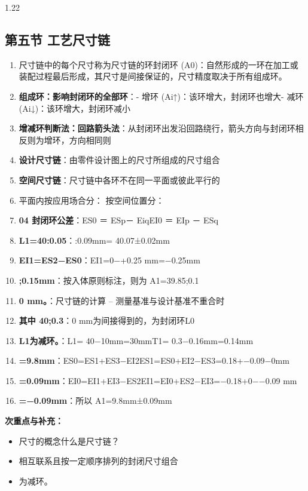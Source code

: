 \documentclass[12pt,a4paper]{article}
\begin{document}
\begin{spacing}{1.22}
\subsection{第五节 工艺尺寸链}
\begin{tcolorbox}[colback=yellow!6,colframe=red!55!black,title=重点,left=1mm,right=1mm]
\begin{enumerate}[leftmargin=2.2em,label=\arabic*.]
  \item 尺寸链中的每个尺寸称为尺寸链的环封闭环 (A0)：自然形成的一环在加工或装配过程最后形成，其尺寸是间接保证的，尺寸精度取决于所有组成环。
  \item \textbf{组成环：影响封闭环的全部环}：- 增环 (Ai↑)：该环增大，封闭环也增大- 减环 (Ai↓)：该环增大，封闭环减小
  \item \textbf{增减环判断法：回路箭头法}：从封闭环出发沿回路绕行，箭头方向与封闭环相反则为增环，方向相同则
  \item \textbf{设计尺寸链}：由零件设计图上的尺寸所组成的尺寸组合
  \item \textbf{空间尺寸链}：尺寸链中各环不在同一平面或彼此平行的
  \item 平面内按应用场合分： 按空间位置分：
  \item \textbf{04 封闭环公差}：ES0 ＝ ESp－ EiqEI0 ＝ EIp － ESq
  \item \textbf{L1=40:0.05}：:0.09mm= 40.07±0.02mm
  \item \textbf{EI1=ES2−ES0}：EI1=0−+0.25 mm=−0.25mm
  \item \textbf{;0.15mm}：按入体原则标注，则为 A1=39.85;0.1
  \item \textbf{0 mm。}：尺寸链的计算 – 测量基准与设计基准不重合时
  \item \textbf{其中 40;0.3}：0 mm为间接得到的，为封闭环L0
  \item \textbf{L1为减环。}：L1= 40−10mm=30mmT1= 0.3−0.16mm=0.14mm
  \item \textbf{=9.8mm}：ES0=ES1+ES3−EI2ES1=ES0+EI2−ES3=0.18+−0.09−0mm
  \item \textbf{=0.09mm}：EI0=EI1+EI3−ES2EI1=EI0+ES2−EI3=−0.18+0−−0.09 mm
  \item \textbf{=−0.09mm}：所以 A1=9.8mm±0.09mm
\end{enumerate}
\end{tcolorbox}
\noindent\textbf{次重点与补充：}
\begin{itemize}[leftmargin=2.2em,label=--]
  \item 尺寸的概念什么是尺寸链？
  \item 相互联系且按一定顺序排列的封闭尺寸组合
  \item 为减环。

\end{itemize}
\end{spacing}
\end{document}
